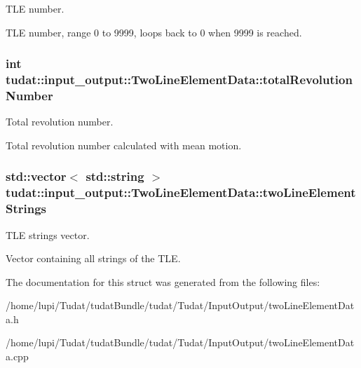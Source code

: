 T\+LE number. 

T\+LE number, range 0 to 9999, loops back to 0 when 9999 is reached. 
\subsubsection[{\texorpdfstring{total\+Revolution\+Number}{totalRevolutionNumber}}]{\setlength{\rightskip}{0pt plus 5cm}int tudat\+::input\+\_\+output\+::\+Two\+Line\+Element\+Data\+::total\+Revolution\+Number}\hypertarget{structtudat_1_1input__output_1_1TwoLineElementData_a6c11f81942e88be63786236eb39805a2}{}\label{structtudat_1_1input__output_1_1TwoLineElementData_a6c11f81942e88be63786236eb39805a2}


Total revolution number. 

Total revolution number calculated with mean motion. 
\subsubsection[{\texorpdfstring{two\+Line\+Element\+Strings}{twoLineElementStrings}}]{\setlength{\rightskip}{0pt plus 5cm}std\+::vector$<$ std\+::string $>$ tudat\+::input\+\_\+output\+::\+Two\+Line\+Element\+Data\+::two\+Line\+Element\+Strings}\hypertarget{structtudat_1_1input__output_1_1TwoLineElementData_acaacfe990d1e8cc5d6035c503354bae2}{}\label{structtudat_1_1input__output_1_1TwoLineElementData_acaacfe990d1e8cc5d6035c503354bae2}


T\+LE strings vector. 

Vector containing all strings of the T\+LE. 

The documentation for this struct was generated from the following files\+:\begin{DoxyCompactItemize}
\item 
/home/lupi/\+Tudat/tudat\+Bundle/tudat/\+Tudat/\+Input\+Output/two\+Line\+Element\+Data.\+h\item 
/home/lupi/\+Tudat/tudat\+Bundle/tudat/\+Tudat/\+Input\+Output/two\+Line\+Element\+Data.\+cpp\end{DoxyCompactItemize}
